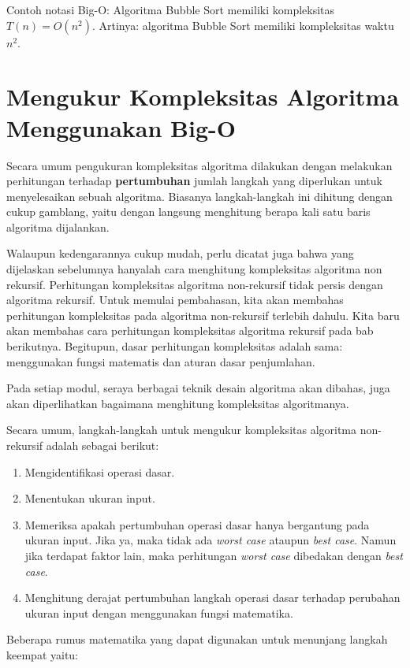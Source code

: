 Contoh notasi Big-O: Algoritma Bubble Sort memiliki kompleksitas $T(n) = O(n^2)$. Artinya: algoritma Bubble Sort memiliki kompleksitas waktu $n^2$. 

\section{Mengukur Kompleksitas Algoritma Menggunakan Big-O}

Secara umum pengukuran kompleksitas algoritma dilakukan dengan melakukan perhitungan terhadap \textbf{pertumbuhan} jumlah langkah yang diperlukan untuk menyelesaikan sebuah algoritma. Biasanya langkah-langkah ini dihitung dengan cukup gamblang, yaitu dengan langsung menghitung berapa kali satu baris algoritma dijalankan.

Walaupun kedengarannya cukup mudah, perlu dicatat juga bahwa yang dijelaskan sebelumnya hanyalah cara menghitung kompleksitas algoritma non rekursif. Perhitungan kompleksitas algoritma non-rekursif tidak persis dengan algoritma rekursif. Untuk memulai pembahasan, kita akan membahas perhitungan kompleksitas pada algoritma non-rekursif terlebih dahulu. Kita baru akan membahas cara perhitungan kompleksitas algoritma rekursif pada bab berikutnya. Begitupun, dasar perhitungan kompleksitas adalah sama: menggunakan fungsi matematis dan aturan dasar penjumlahan.

Pada setiap modul, seraya berbagai teknik desain algoritma akan dibahas, juga akan diperlihatkan bagaimana menghitung kompleksitas algoritmanya. 

Secara umum, langkah-langkah untuk mengukur kompleksitas algoritma non-rekursif adalah sebagai berikut:

\begin{enumerate}
    \item Mengidentifikasi operasi dasar.
    \item Menentukan ukuran input.
    \item Memeriksa apakah pertumbuhan operasi dasar hanya bergantung pada ukuran input. Jika ya, maka tidak ada \textit{worst case} ataupun \textit{best case}. Namun jika terdapat faktor lain, maka perhitungan \textit{worst case} dibedakan dengan \textit{best case}.
    \item Menghitung derajat pertumbuhan langkah operasi dasar terhadap perubahan ukuran input dengan menggunakan fungsi matematika.
\end{enumerate}

Beberapa rumus matematika yang dapat digunakan untuk menunjang langkah keempat yaitu:

